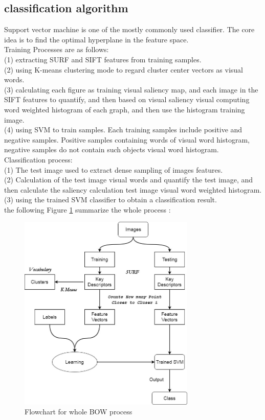 \subsection{classification algorithm }
 Support vector machine is one of the mostly
commonly used classiﬁer. The core idea is to ﬁnd the optimal
hyperplane in the feature space.\\
Training Processes are as follows:\\ (1) extracting SURF
and SIFT features from training samples.\\ (2) using K-means
clustering mode to regard cluster center vectors as visual
words.\\ (3) calculating each ﬁgure as training visual saliency
map, and each image in the SIFT features to quantify, and
then based on visual saliency visual computing word weighted
histogram of each graph, and then use the histogram training
image.\\ (4) using SVM to train samples. Each training samples
include positive and negative samples. Positive samples containing
words of visual word histogram, negative samples do
not contain such objects visual word histogram.\\ Classiﬁcation
process:\\ (1) The test image used to extract dense sampling of
images features. \\(2) Calculation of the test image visual words
and quantify the test image, and then calculate the saliency
calculation test image visual word weighted histogram.\\ (3)
using the trained SVM classiﬁer to obtain a classiﬁcation
result.\\
the following Figure \ref{fig:algo1}  summarize the whole  process :

\begin{figure}[H]
\centering
\includegraphics[width=0.75\textwidth]{img/myalgo.jpg}
\caption{Flowchart for whole BOW process }
\label{fig:algo1}
\end{figure}

